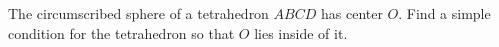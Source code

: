 The circumscribed sphere of a tetrahedron $ABCD$ has center $O$. Find a simple condition for the tetrahedron so that $O$ lies inside of it.
